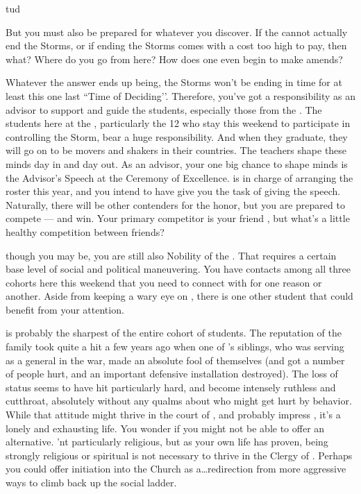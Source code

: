 tud\documentclass[char]{GL2020}
\begin{document}
 But you must also be prepared for whatever you discover. If the \pTech{} cannot actually end the Storms, or if ending the Storms comes with a cost too high to pay, then what? Where do you go from here? How does one even begin to make amends?

Whatever the answer ends up being, the Storms won't be ending in time for at least this one last ``Time of Deciding’’. Therefore, you've got a responsibility as an advisor to support and guide the students, especially those from the \pFarm{}. The students here at the \pSc{}, particularly the 12 who stay this weekend to participate in controlling the Storm, bear a huge responsibility. And when they graduate, they will go on to be movers and shakers in their countries. The teachers shape these minds day in and day out. As an advisor, your one big chance to shape minds is the Advisor's Speech at the Ceremony of Excellence. \cMusic{} is in charge of arranging the roster this year, and you intend to have \cMusic{\them} give you the task of giving the speech. Naturally, there will be other contenders for the honor, but you are prepared to compete — and win. Your primary competitor is your friend \cCurse{}, but what's a little healthy competition between friends?

\cHedonist{\Cleric} though you may be, you are still also Nobility of the \pFarm{}. That requires a certain base level of social and political maneuvering. You have contacts among all three cohorts here this weekend that you need to connect with for one reason or another. Aside from keeping a wary eye on \cDisney{}, there is one other student that could benefit from your attention.

\cLibAssist{} is probably the sharpest of the entire cohort of students. The reputation of the \cLibAssist{\formal} family took quite a hit a few years ago when one of \cLibAssist{}’s siblings, who was serving as a general in the war, made an absolute fool of themselves (and got a number of people hurt, and an important defensive installation destroyed). The loss of status seems to have hit \cLibAssist{} particularly hard, and \cLibAssist{\theyhave} become intensely ruthless and cutthroat, absolutely without any qualms about who might get hurt by \cLibAssist{\their} behavior. While that attitude might thrive in the court of \cQueen{\full}, and probably impress \cPrince{}, it’s a lonely and exhausting life. You wonder if you might not be able to offer \cLibAssist{} an alternative. \cLibAssist{\Theyare}’nt particularly religious, but as your own life has proven, being strongly religious or spiritual is not necessary to thrive in the Clergy of \cFarmGod{}. Perhaps you could offer initiation into the Church as a\ldots redirection from more aggressive ways to climb back up the social ladder.
\end{document}
